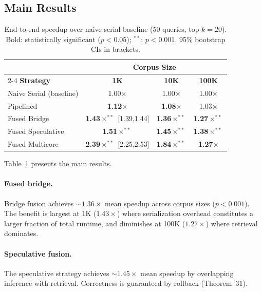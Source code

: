 \documentclass{article}
\theoremstyle{definition}
\theoremstyle{remark}
\begin{document}
\subsection{Main Results}

\begin{table}[t]
\centering
\caption{End-to-end speedup over naive serial baseline (50 queries, top-$k{=}20$). Bold: statistically significant ($p < 0.05$); $^{**}$: $p < 0.001$. 95\% bootstrap CIs in brackets.}\label{tab:speedup}
\smallskip
\begin{tabular}{@{}lccc@{}}
\toprule
& \multicolumn{3}{c}{\textbf{Corpus Size}} \\
\cmidrule(lr){2-4}
\textbf{Strategy} & \textbf{1K} & \textbf{10K} & \textbf{100K} \\
\midrule
Naive Serial (baseline) & 1.00$\times$ & 1.00$\times$ & 1.00$\times$ \\
Pipelined        & \textbf{1.12$\times$} & \textbf{1.08$\times$} & 1.03$\times$ \\
Fused Bridge     & \textbf{1.43$\times^{**}$} \scriptsize{[1.39,1.44]} & \textbf{1.36$\times^{**}$} & \textbf{1.27$\times^{**}$} \\
Fused Speculative & \textbf{1.51$\times^{**}$} & \textbf{1.45$\times^{**}$} & \textbf{1.38$\times^{**}$} \\
Fused Multicore  & \textbf{2.39$\times^{**}$} \scriptsize{[2.25,2.53]} & \textbf{1.84$\times^{**}$} & \textbf{1.27$\times$} \\
\bottomrule
\end{tabular}
\end{table}

Table~\ref{tab:speedup} presents the main results.

\paragraph{Fused bridge.}
Bridge fusion achieves ${\sim}1.36\times$ mean speedup across corpus sizes ($p < 0.001$).
The benefit is largest at 1K ($1.43\times$) where serialization overhead constitutes a larger fraction of total runtime, and diminishes at 100K ($1.27\times$) where retrieval dominates.

\paragraph{Speculative fusion.}
The speculative strategy achieves ${\sim}1.45\times$ mean speedup by overlapping inference with retrieval.
Correctness is guaranteed by rollback (Theorem~31).
\end{document}
